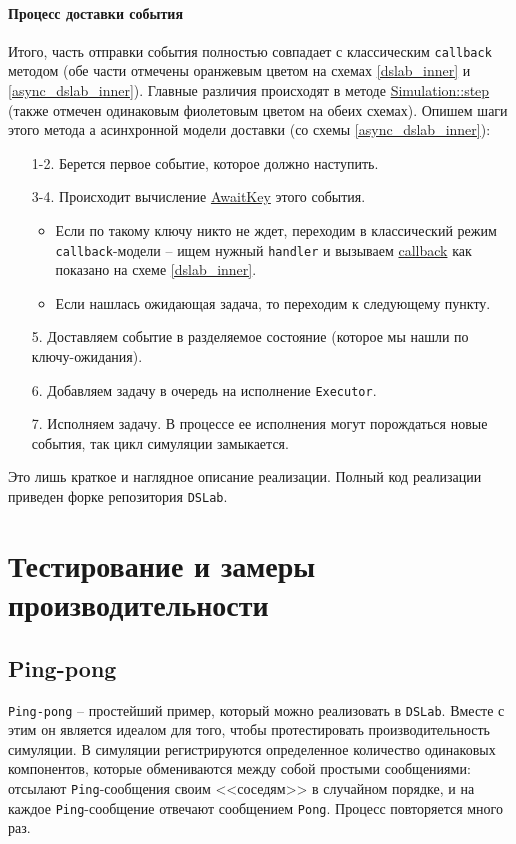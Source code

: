 \paragraph{Процесс доставки события} Итого, часть отправки события полностью совпадает с классическим \texttt{callback} методом (обе части отмечены оранжевым цветом на схемах \ref{dslab_inner} и \ref{async_dslab_inner}). Главные различия происходят в методе \hyperref[Simulation::step]{Simulation::step} (также отмечен одинаковым фиолетовым цветом на обеих схемах). Опишем шаги этого метода а асинхронной модели доставки (со схемы \ref{async_dslab_inner}):
\begin{enumerate}
    \item[1-2.] Берется первое событие, которое должно наступить. 
    \item[3-4.] Происходит вычисление \hyperref[awaitkey]{AwaitKey} этого события.
    \begin{itemize} \item Если по такому ключу никто не ждет, переходим в классический режим \texttt{callback}-модели -- ищем нужный \texttt{handler} и вызываем \hyperref[fnon]{callback} как показано на схеме \ref{dslab_inner}.
        \item Если нашлась ожидающая задача, то переходим к следующему пункту.
    \end{itemize}
    \item[5.] Доставляем событие в разделяемое состояние (которое мы нашли по ключу-ожидания).
    \item[6.] Добавляем задачу в очередь на исполнение \texttt{Executor}.
    \item[7.] Исполняем задачу. В процессе ее исполнения могут порождаться новые события, так цикл симуляции замыкается.  
\end{enumerate}

Это лишь краткое и наглядное описание реализации. Полный код реализации приведен форке репозитория \texttt{DSLab}\cite{async-dslab-core}. 
\section{Тестирование и замеры производительности} \label{async-testing}

\subsection{Ping-pong}

\texttt{Ping-pong} -- простейший пример, который можно реализовать в \texttt{DSLab}. Вместе с этим он является идеалом для того, чтобы протестировать производительность симуляции. В симуляции регистрируются определенное количество одинаковых компонентов, которые обмениваются между собой простыми сообщениями: отсылают \texttt{Ping}-сообщения своим <<соседям>> в случайном порядке, и на каждое \texttt{Ping}-сообщение отвечают сообщением \texttt{Pong}. Процесс повторяется много раз.

